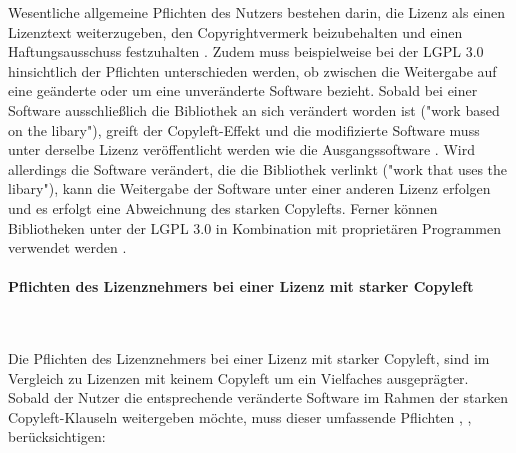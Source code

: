 Wesentliche allgemeine Pflichten des Nutzers bestehen darin, die Lizenz als einen Lizenztext weiterzugeben, den Copyrightvermerk beizubehalten und einen Haftungsausschuss festzuhalten \cite[S. 11]{bitkom_open_nodate}. Zudem muss beispielweise bei der LGPL 3.0 hinsichtlich der Pflichten unterschieden werden, ob zwischen die Weitergabe auf eine geänderte oder um eine unveränderte Software bezieht. Sobald bei einer Software ausschließlich die Bibliothek an sich verändert worden ist ("work based on the libary"), greift der Copyleft-Effekt und die modifizierte Software muss unter derselbe Lizenz veröffentlicht werden wie die Ausgangssoftware \cite[S. 59]{schaaf_open-source-lizenzen_2013}. Wird allerdings die Software verändert, die die Bibliothek verlinkt ("work that uses the libary"), kann die Weitergabe der Software unter einer anderen Lizenz erfolgen und es erfolgt eine Abweichnung des starken Copylefts. Ferner können Bibliotheken unter der LGPL 3.0 in Kombination mit proprietären Programmen verwendet werden \cite[S. 65]{bitkom_open_2016}.

\paragraph{Pflichten des Lizenznehmers bei einer Lizenz mit starker Copyleft}$~$

Die Pflichten des Lizenznehmers bei einer Lizenz mit starker Copyleft, sind im Vergleich zu Lizenzen mit keinem Copyleft um ein Vielfaches ausgeprägter. Sobald der Nutzer die entsprechende veränderte Software im Rahmen der starken Copyleft-Klauseln weitergeben möchte, muss dieser umfassende Pflichten \cite[S.30 - 34]{allmann_open_2019}, \cite[S. 54 - 58]{schaaf_open-source-lizenzen_2013}, \cite[S. 63 - 65]{bitkom_open_2016} berücksichtigen: 

